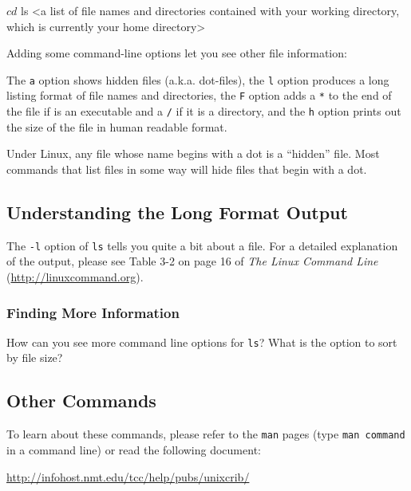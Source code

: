 \documentclass[11pt]{cselabheader}
\begin{document}
\begin{bashcode}
$ cd
$ ls
<a list of file names and directories contained 
with your working directory, which is currently
your home directory>
\end{bashcode}

Adding some command-line options let you see other file information:


The \texttt{a} option shows hidden files (a.k.a. dot-files), the \texttt{l}
option produces a long listing format of file names and directories, the
\texttt{F} option adds a \texttt{*} to the end of the file if is an executable
and a \texttt{/} if it is a directory, and the \texttt{h} option prints out the
size of the file in human readable format.

Under Linux, any file whose name begins with a dot is a ``hidden'' file. Most
commands that list files in some way will hide files that begin with a dot.

\subsection*{Understanding the Long Format Output}

The \texttt{-l} option of \texttt{ls} tells you quite a bit about a file. For a
detailed explanation of the output, please see Table 3-2 on page 16 of
\textit{The Linux Command Line} (\url{http://linuxcommand.org}).

\subsubsection*{Finding More Information}

How can you see more command line options for \texttt{ls}? What is the option to
sort by file size?

\subsection{Other Commands}

To learn about these commands, please refer to the \texttt{man} pages (type
\texttt{man command} in a command line) or read the following document:
\begin{center}
\url{http://infohost.nmt.edu/tcc/help/pubs/unixcrib/}
\end{center}
\end{document}
